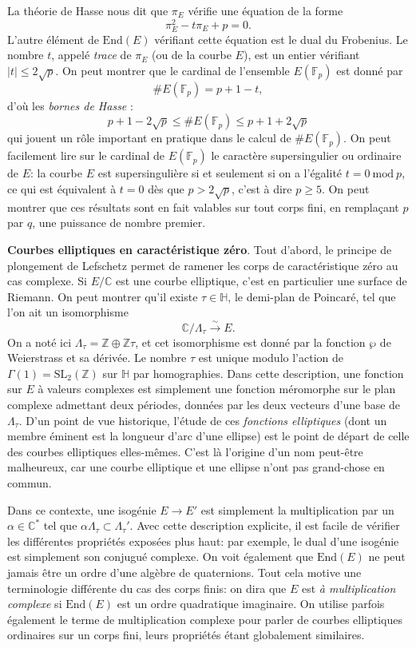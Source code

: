 \documentclass[11pt,a4paper]{article}
\newcommand{\Z}{\mathbb{Z}}
\newcommand{\C}{\mathbb{C}}
\newcommand{\F}{\mathbb{F}}
\renewcommand{\H}{\mathbb{H}}
\newcommand{\vers}{\longrightarrow}
\newcommand{\End}{\mathrm{End}}
\renewcommand{\mod}{\ \mathrm{mod}\ }
\renewcommand{\v}{\vspace{5mm}}
\theoremstyle{definition}
\begin{document}
La théorie de Hasse nous dit que $\pi_E$ vérifie une équation de la forme
$$\pi_E^2 - t \pi_E + p = 0.$$
L'autre élément de $\End(E)$ vérifiant cette équation est le dual du Frobenius.
Le nombre $t$, appelé \emph{trace} de $\pi_E$ (ou de la courbe $E$), est un entier vérifiant $|t|\leq 2\sqrt{p}$. On peut montrer que le cardinal de l'ensemble $E(\F_p)$ est donné par
$$\# E(\F_p) = p + 1 - t,$$
d'où les \emph{bornes de Hasse} :
$$p + 1 - 2\sqrt{p} \leq \#E(\F_p) \leq p + 1 + 2\sqrt{p}$$
qui jouent un rôle important en pratique dans le calcul de $\# E(\F_p)$. On peut facilement lire sur le cardinal de $E(\F_p)$ le caractère supersingulier ou ordinaire de $E$: la courbe $E$ est supersingulière si et seulement si on a l'égalité $t = 0 \mod p$, ce qui est équivalent à $t=0$ dès que $p > 2\sqrt{p}$, c'est à dire $p \geq 5$. On peut montrer que ces résultats sont en fait valables sur tout corps fini, en remplaçant $p$ par $q$, une puissance de nombre premier.

\v

\textbf{Courbes elliptiques en caractéristique zéro}. Tout d'abord, le principe de plongement de Lefschetz permet de ramener les corps de caractéristique zéro au cas complexe. Si $E/\C$ est une courbe elliptique, c'est en particulier une surface de Riemann. On peut montrer qu'il existe $\tau\in \H$, le demi-plan de Poincaré, tel que l'on ait un isomorphisme
$$\C/\Lambda_\tau \overset{\sim}{\vers} E.$$
On a noté ici $\Lambda_\tau = \Z\oplus \Z\tau$, et cet isomorphisme est donné par la fonction $\wp$ de Weierstrass et sa dérivée. Le nombre $\tau$ est unique modulo l'action de $\Gamma(1) = \mathrm{SL}_2(\Z)$ sur $\H$ par homographies. Dans cette description, une fonction sur $E$ à valeurs complexes est simplement une fonction méromorphe sur le plan complexe admettant deux périodes, données par les deux vecteurs d'une base de $\Lambda_\tau$. D'un point de vue historique, l'étude de ces \emph{fonctions elliptiques} (dont un membre éminent est la longueur d'arc d'une ellipse) est le point de départ de celle des courbes elliptiques elles-mêmes. C'est là l'origine d'un nom peut-être malheureux, car une courbe elliptique et une ellipse n'ont pas grand-chose en commun.

Dans ce contexte, une isogénie $E\vers E'$ est simplement la multiplication par un $\alpha\in \C^*$ tel que $\alpha \Lambda_\tau \subset \Lambda_\tau'$. Avec cette description explicite, il est facile de vérifier les différentes propriétés exposées plus haut: par exemple, le dual d'une isogénie est simplement son conjugué complexe. On voit également que $\End(E)$ ne peut jamais être un ordre d'une algèbre de quaternions. Tout cela motive une terminologie différente du cas des corps finis: on dira que $E$ est \emph{à multiplication complexe} si $\End(E)$ est un ordre quadratique imaginaire.
On utilise parfois également le terme de multiplication complexe pour parler de courbes elliptiques ordinaires sur un corps fini, leurs propriétés étant globalement similaires.
\end{document}
